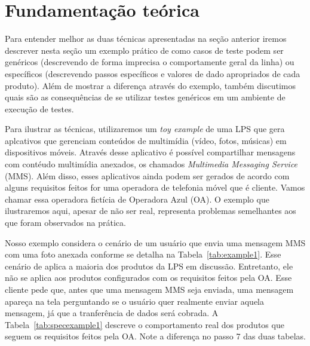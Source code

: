 \section{Fundamenta\c{c}\~ao te\'orica}

\label{sec:fundamentacao}
Para entender melhor as duas técnicas apresentadas na seção anterior iremos
descrever nesta seção um exemplo prático de como casos de teste podem ser
genéricos (descrevendo de forma imprecisa o comportamente geral da linha) ou
específicos (descrevendo passos específicos e valores de dado apropriados de
cada produto). Além de mostrar a diferença através do exemplo, também discutimos
quais são as consequências de se utilizar testes genéricos em um ambiente de
execução de testes. 

Para ilustrar as técnicas, utilizaremos um \emph{toy example} de uma LPS que
gera aplcativos que gerenciam conteúdos de multimídia (vídeo, fotos, músicas) em
dispositivos móveis. Através desse aplicativo é possível compartilhar mensagens
com contéudo multimídia anexados, os chamados \emph{Multimedia Messaging
Service} (MMS). Além disso, esses aplicativos ainda podem ser gerados de acordo
com alguns requisitos feitos for uma operadora de telefonia móvel que é cliente.
Vamos chamar essa operadora fictícia de Operadora Azul (OA). O exemplo que
ilustraremos aqui, apesar de não ser real, representa problemas semelhantes aos que foram
observados na prática.

Nosso exemplo considera o cenário de um usuário que envia uma mensagem MMS com
uma foto anexada conforme se detalha na Tabela~\ref{tab:example1}. Esse cenário
de aplica a maioria dos produtos da LPS em discussão. Entretanto, ele não se
aplica aos produtos configurados com os requisitos feitos pela OA. Esse cliente
pede que, antes que uma mensagem MMS seja enviada, uma mensagem apareça na tela
perguntando se o usuário quer realmente enviar aquela mensagem, já que a
tranferência de dados será cobrada. A Tabela~\ref{tab:specexample1} descreve o
comportamento real dos produtos que seguem os requisitos feitos pela OA. Note a
diferença no passo 7 das duas tabelas.


